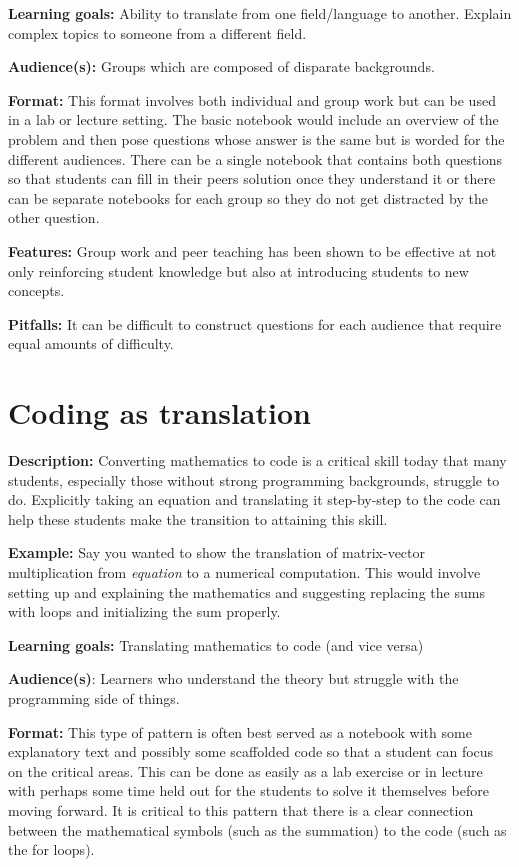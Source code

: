 \documentclass[]{book}
\begin{document}
\textbf{Learning goals:}
Ability to translate from one field/language to another. Explain complex topics
to someone from a different field.

\textbf{Audience(s):}
Groups which are composed of disparate backgrounds.

\textbf{Format:}
This format involves both individual and group work but can be used in a lab or
lecture setting. The basic notebook would include an overview of the problem
and then pose questions whose answer is the same but is worded for the
different audiences. There can be a single notebook that contains both
questions so that students can fill in their peers solution once they
understand it or there can be separate notebooks for each group so they do not
get distracted by the other question.

\textbf{Features:}
Group work and peer teaching has been shown to be effective at not only
reinforcing student knowledge but also at introducing students to new concepts.

\textbf{Pitfalls:}
It can be difficult to construct questions for each audience that require equal
amounts of difficulty.

\hypertarget{coding-as-translation}{%
\section{Coding as translation}\label{coding-as-translation}}

\textbf{Description:}
Converting mathematics to code is a critical skill today that many students,
especially those without strong programming backgrounds, struggle to do.
Explicitly taking an equation and translating it step-by-step to the code can help
these students make the transition to attaining this skill.

\textbf{Example:}
Say you wanted to show the translation of matrix-vector multiplication from \emph{equation}
to a numerical computation. This would involve setting up and explaining the
mathematics and suggesting replacing the sums with loops and initializing the sum properly.

\textbf{Learning goals:}
Translating mathematics to code (and vice versa)

\textbf{Audience(s)}:
Learners who understand the theory but struggle with the programming side of things.

\textbf{Format:}
This type of pattern is often best served as a notebook with some explanatory text and
possibly some scaffolded code so that a student can focus on the critical areas.
This can be done as easily as a lab exercise or in lecture with perhaps some time held
out for the students to solve it themselves before moving forward. It is critical to this
pattern that there is a clear connection between the mathematical symbols (such as the
summation) to the code (such as the for loops).
\end{document}
